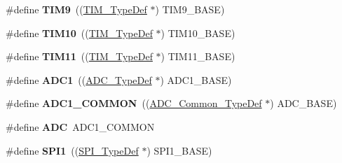 \begin{DoxyCompactItemize}
\item 
\hypertarget{group___peripheral__declaration_gaf52b4b4c36110a0addfa98059f54a50e}{\#define {\bfseries T\-I\-M9}~((\hyperlink{struct_t_i_m___type_def}{T\-I\-M\-\_\-\-Type\-Def} $\ast$) T\-I\-M9\-\_\-\-B\-A\-S\-E)}\label{group___peripheral__declaration_gaf52b4b4c36110a0addfa98059f54a50e}

\item 
\hypertarget{group___peripheral__declaration_ga46b2ad3f5f506f0f8df0d2ec3e767267}{\#define {\bfseries T\-I\-M10}~((\hyperlink{struct_t_i_m___type_def}{T\-I\-M\-\_\-\-Type\-Def} $\ast$) T\-I\-M10\-\_\-\-B\-A\-S\-E)}\label{group___peripheral__declaration_ga46b2ad3f5f506f0f8df0d2ec3e767267}

\item 
\hypertarget{group___peripheral__declaration_gacfd11ef966c7165f57e2cebe0abc71ad}{\#define {\bfseries T\-I\-M11}~((\hyperlink{struct_t_i_m___type_def}{T\-I\-M\-\_\-\-Type\-Def} $\ast$) T\-I\-M11\-\_\-\-B\-A\-S\-E)}\label{group___peripheral__declaration_gacfd11ef966c7165f57e2cebe0abc71ad}

\item 
\hypertarget{group___peripheral__declaration_ga90d2d5c526ce5c0a551f533eccbee71a}{\#define {\bfseries A\-D\-C1}~((\hyperlink{struct_a_d_c___type_def}{A\-D\-C\-\_\-\-Type\-Def} $\ast$) A\-D\-C1\-\_\-\-B\-A\-S\-E)}\label{group___peripheral__declaration_ga90d2d5c526ce5c0a551f533eccbee71a}

\item 
\hypertarget{group___peripheral__declaration_gaf1919c64fc774aab31190346fd5457e2}{\#define {\bfseries A\-D\-C1\-\_\-\-C\-O\-M\-M\-O\-N}~((\hyperlink{struct_a_d_c___common___type_def}{A\-D\-C\-\_\-\-Common\-\_\-\-Type\-Def} $\ast$) A\-D\-C\-\_\-\-B\-A\-S\-E)}\label{group___peripheral__declaration_gaf1919c64fc774aab31190346fd5457e2}

\item 
\hypertarget{group___peripheral__declaration_ga54d148b91f3d356713f7e367a2243bea}{\#define {\bfseries A\-D\-C}~A\-D\-C1\-\_\-\-C\-O\-M\-M\-O\-N}\label{group___peripheral__declaration_ga54d148b91f3d356713f7e367a2243bea}

\item 
\hypertarget{group___peripheral__declaration_gad483be344a28ac800be8f03654a9612f}{\#define {\bfseries S\-P\-I1}~((\hyperlink{struct_s_p_i___type_def}{S\-P\-I\-\_\-\-Type\-Def} $\ast$) S\-P\-I1\-\_\-\-B\-A\-S\-E)}\label{group___peripheral__declaration_gad483be344a28ac800be8f03654a9612f}


\end{DoxyCompactItemize}
